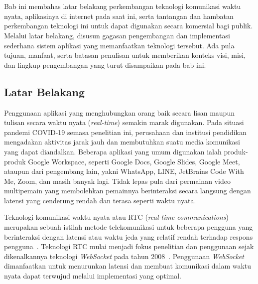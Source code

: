 \chapter{\babSatu}
\label{bab:1}
Bab ini membahas latar belakang perkembangan teknologi komunikasi waktu nyata, aplikasinya di internet pada saat ini, serta tantangan dan hambatan perkembangan teknologi ini untuk dapat digunakan secara komersial bagi publik. Melalui latar belakang, disusun gagasan pengembangan dan implementasi sederhana sistem aplikasi yang memanfaatkan teknologi tersebut. Ada pula tujuan, manfaat, serta batasan penulisan untuk memberikan konteks visi, misi, dan lingkup pengembangan yang turut disampaikan pada bab ini.

\section{Latar Belakang}
\label{sec:latarBelakang}
Penggunaan aplikasi yang menghubungkan orang baik secara lisan maupun tulisan secara waktu nyata (\textit{real-time}) semakin marak digunakan. Pada situasi pandemi COVID-19 semasa penelitian ini, perusahaan dan institusi pendidikan mengadakan aktivitas jarak jauh dan membutuhkan suatu media komunikasi yang dapat diandalkan. Beberapa aplikasi yang umum digunakan ialah produk-produk Google Workspace, seperti Google Docs, Google Slides, Google Meet, ataupun dari pengembang lain, yakni WhatsApp, LINE, JetBrains Code With Me, Zoom, dan masih banyak lagi. Tidak lepas pula dari permainan video multipemain yang membolehkan pemainnya berinteraksi secara langsung dengan latensi yang cenderung rendah dan terasa seperti waktu nyata.

Teknologi komunikasi waktu nyata atau RTC (\textit{real-time communications}) merupakan sebuah istilah metode telekomunikasi untuk beberapa pengguna yang berinteraksi dengan latensi atau waktu jeda yang relatif rendah terhadap respons pengguna~\citep{arefin2013modified}. Teknologi RTC mulai menjadi fokus penelitian dan penggunaan sejak dikenalkannya teknologi \textit{WebSocket} pada tahun 2008~\citep{fette2011websocket, reynolds2008web}. Penggunaan \textit{WebSocket} dimanfaatkan untuk menurunkan latensi dan membuat komunikasi dalam waktu nyata dapat terwujud melalui implementasi yang optimal.

